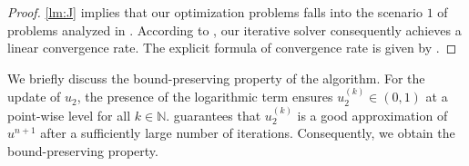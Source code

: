 \begin{proof}
    \ref{lm:J} implies that our optimization problems falls into the scenario $1$ of problems analyzed in \cite{deng2016global}. 
According to \cite[Theorem 3.4]{deng2016global}, our iterative solver  consequently achieves a linear convergence rate. 
The explicit formula of convergence rate is given by \cite[Corollary 3.6]{deng2016global}.
\end{proof}

\begin{remark}
We briefly discuss the bound-preserving property of the algorithm. 
For the update of $u_2$, the presence of the logarithmic term ensures $u_2^{(k)}\in(0,1)$ at a point-wise level for all $k \in \mathbb{N}$. 
 guarantees that $u_2^{(k)}$ is a good approximation of $u^{n+1}$ after a sufficiently large number of iterations. 
Consequently, we obtain the bound-preserving property.
\end{remark}





